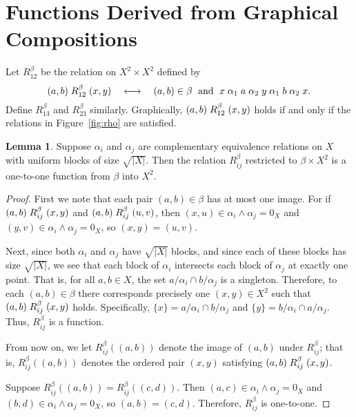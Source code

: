 \documentclass{amsart}
\theoremstyle{plain}
\theoremstyle{definition}
\newtheorem{lemma}{Lemma}
\theoremstyle{definition}
\numberwithin{equation}{section}
\newcommand{\<}{\ensuremath{\langle}}
\renewcommand{\>}{\ensuremath{\rangle}}
\newcommand{\rel}{\ensuremath{\mathrel}}
\newcommand{\meet}{\ensuremath{\wedge}}
\begin{document}
\section{Functions Derived from Graphical Compositions}
Let $R_{12}^\beta$ be the relation on $X^2 \times X^2$ defined by 
\[
(a,b) \rel{R_{12}^\beta} (x,y) \quad \longleftrightarrow \quad 
(a,b) \in \beta \; \text{ and } \;
x \rel{\alpha_1} a \rel{\alpha_2} y \rel{\alpha_1} b \rel{\alpha_2} x.
\]
Define $R_{13}^\beta$ and $R_{23}^\beta$ similarly.  Graphically, 
$(a,b) \rel{R_{12}^\beta} (x,y)$ holds if and only if the relations in
Figure~\ref{fig:rho} are satisfied.
\begin{lemma}
\label{lem:injection}
Suppose $\alpha_i$ and $\alpha_j$ are complementary equivalence
relations on $X$ with uniform blocks of size $\sqrt{|X|}$.
Then the relation $R_{ij}^\beta$ restricted to $\beta\times X^2$ is
  a one-to-one function from $\beta$ into $X^2$.
\end{lemma}
\begin{proof}
First we note that each pair $(a,b)\in \beta$ has at most one image. For if
$(a,b) \rel{R_{ij}^\beta} (x,y)$ and $(a,b) \rel{R_{ij}^\beta} (u,v)$, then 
$(x,u) \in  \alpha_i \meet \alpha_j = 0_X$ and 
$(y,v) \in  \alpha_i \meet \alpha_j = 0_X$, so $(x,y) = (u,v)$.

Next,
since both $\alpha_i$ and $\alpha_j$ have 
$\sqrt{|X|}$ blocks, and since each of these blocks has size $\sqrt{|X|}$, we
see that each block of $\alpha_i$ intersects each block of $\alpha_j$ at
exactly one point.  That is, for all $a, b \in X$, the set 
$a/\alpha_i \cap b/\alpha_j$ is a singleton.
Therefore, to each $(a,b)\in \beta$ there corresponds precisely one $(x,y)\in
X^2$ such that $(a,b) \rel{R_{ij}^\beta} (x,y)$ holds.  
Specifically, $\{x\} = a/\alpha_i \cap b/\alpha_j$ and 
$\{y\} = b/\alpha_i \cap a/\alpha_j$. 
Thus,  $R_{ij}^\beta$ is a function.  

From now on, we let 
$R_{ij}^\beta((a,b))$ denote the image of $(a,b)$ under $R_{ij}^\beta$; that
is, $R_{ij}^\beta((a,b))$ denotes the ordered pair $(x,y)$
satisfying $(a,b) \rel{R_{ij}^\beta} (x,y)$.


Suppose $R_{ij}^\beta((a,b)) = R_{ij}^\beta((c,d))$. Then 
$(a,c) \in \alpha_i\meet \alpha_j = 0_X$
and
$(b,d) \in \alpha_i\meet \alpha_j = 0_X$, so $(a,b) = (c,d)$.
Therefore,  $R_{ij}^\beta$ is one-to-one.
\end{proof}
\end{document}
